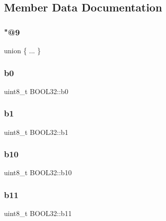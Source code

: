 \subsection{Member Data Documentation}
\hypertarget{struct_b_o_o_l32_a1c195a9154caaed6296920176bc306ee}{}\label{struct_b_o_o_l32_a1c195a9154caaed6296920176bc306ee} 
\subsubsection{\texorpdfstring{"@9}{@9}}
{\footnotesize\ttfamily union \{ ... \} }

\hypertarget{struct_b_o_o_l32_a695f2ea79d7f3143cefe5391ee1ca0bc}{}\label{struct_b_o_o_l32_a695f2ea79d7f3143cefe5391ee1ca0bc} 
\subsubsection{\texorpdfstring{b0}{b0}}
{\footnotesize\ttfamily uint8\+\_\+t B\+O\+O\+L32\+::b0}

\hypertarget{struct_b_o_o_l32_a7e9669f351570749facee83d076f9bc0}{}\label{struct_b_o_o_l32_a7e9669f351570749facee83d076f9bc0} 
\subsubsection{\texorpdfstring{b1}{b1}}
{\footnotesize\ttfamily uint8\+\_\+t B\+O\+O\+L32\+::b1}

\hypertarget{struct_b_o_o_l32_a405fbb96cd9be504fc3ad6b46d663ed0}{}\label{struct_b_o_o_l32_a405fbb96cd9be504fc3ad6b46d663ed0} 
\subsubsection{\texorpdfstring{b10}{b10}}
{\footnotesize\ttfamily uint8\+\_\+t B\+O\+O\+L32\+::b10}

\hypertarget{struct_b_o_o_l32_abb5f609784efd1ce95411de3dc711256}{}\label{struct_b_o_o_l32_abb5f609784efd1ce95411de3dc711256} 
\subsubsection{\texorpdfstring{b11}{b11}}
{\footnotesize\ttfamily uint8\+\_\+t B\+O\+O\+L32\+::b11}

